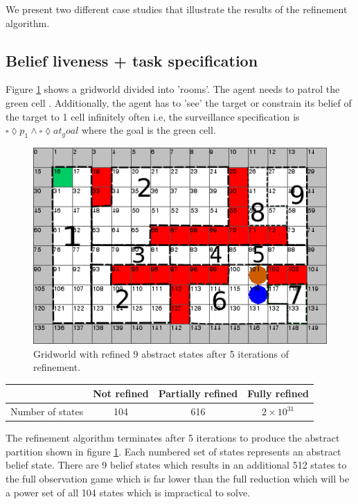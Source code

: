 We present two different case studies that illustrate the results of the refinement algorithm. 

\subsection{Belief liveness + task specification}
Figure \ref{fig:case1} shows a gridworld divided into 'rooms'. The agent needs to patrol the green cell . Additionally, the agent has to 'see' the target or constrain its belief of the target to 1 cell infinitely often i.e, the surveillance specification is $\square \lozenge p_1 \wedge \square \lozenge at_goal$ where the goal is the green cell. 

\begin{figure}
\centering
\includegraphics[scale=0.4]{text970.png}\caption{Gridworld with refined 9 abstract states after 5 iterations of refinement.}\label{fig:case1}
\end{figure}

\begin{table}[h!]
\begin{tabular}{c|c|c|c}
& Not refined & Partially refined & Fully refined \\ \hline \hline
Number of states & 104 & 616 & $2\times10^{31}$
\end{tabular}
\end{table}
The refinement algorithm terminates after 5 iterations to produce the abstract partition shown in figure \ref{fig:case1}. Each numbered set of states represents an abstract belief state. There are 9 belief states which results in an additional 512 states to the full observation game which is far lower than the full reduction which will be a power set of all 104 states which is impractical to solve.  

